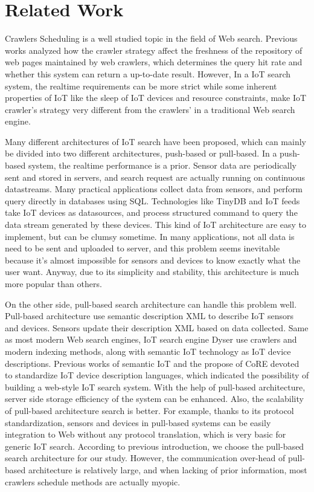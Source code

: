 \documentclass[conference]{IEEEtran}
\begin{document}
\section{Related Work}

Crawlers Scheduling is a well studied topic in the field of Web search. Previous works\cite{Cho2000}\cite{Wolf2002}\cite{Challenger2004} analyzed how the crawler strategy affect the freshness of the repository of web pages maintained by web crawlers, which determines the query hit rate and whether this system can return a up-to-date result. However, In a IoT search system, the realtime requirements can be more strict while some inherent properties of IoT like the sleep of IoT devices and resource constraints, make IoT crawler's strategy very different from the crawlers' in a traditional Web search engine. 


Many different architectures of IoT search have been proposed, which can mainly be divided into two different architectures, push-based or pull-based.
In a push-based system, the realtime performance is a prior. Sensor data are periodically sent and stored in servers, and search request are actually running on continuous datastreams. Many practical applications collect data from sensors, and perform query directly in databases using SQL. Technologies like TinyDB\cite{TinyDB} and IoT feeds\cite{Whitehouse2006} take IoT devices as datasources, and process structured command to query the data stream generated by these devices. This kind of IoT architecture are easy to implement, but can be clumsy sometime. In many applications, not all data is need to be sent and uploaded to server, and this problem seems inevitable because it's almost impossible for sensors and devices to know exactly what the user want. Anyway, due to its simplicity and stability, this architecture is much more popular than others.


On the other side, pull-based search architecture can handle this problem well. Pull-based architecture use semantic description XML to describe IoT sensors and devices. Sensors update their description XML based on data collected. Same as most modern Web search engines, IoT search engine Dyser\cite{Dyser} use crawlers and modern indexing methods, along with semantic IoT technology as IoT device descriptions. Previous works of semantic IoT\cite{Compton2012} and the propose of CoRE\cite{CoREWorkingGroup2012} devoted to standardize IoT device description languages, which indicated the possibility of building a web-style IoT search system. 
With the help of pull-based architecture, server side storage efficiency of the system can be enhanced. Also, the scalability of pull-based architecture search is better. For example, thanks to its protocol standardization, sensors and devices in pull-based systems can be easily integration to Web without any protocol translation, which is very basic for generic IoT search. According to previous introduction, we choose the pull-based search architecture for our study. However, the communication over-head of pull-based architecture is relatively large, and when lacking of prior information, most crawlers schedule methods are actually myopic.
\end{document}
